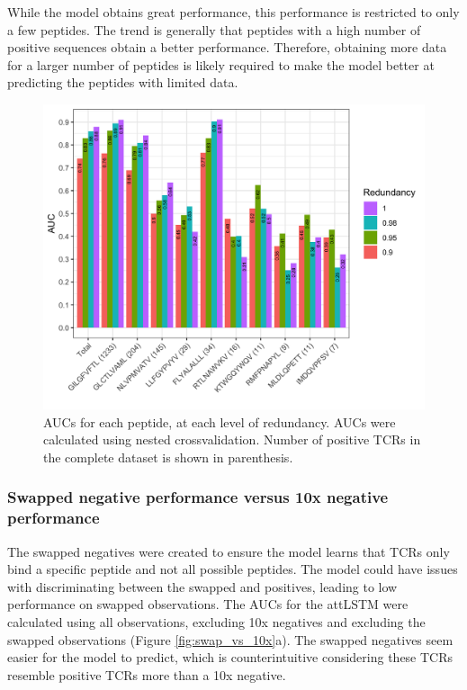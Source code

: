 While the model obtains great performance, this performance is restricted to only a few peptides. The trend is generally that peptides with a high number of positive sequences obtain a better performance. Therefore, obtaining more data for a larger number of peptides is likely required to make the model better at predicting the peptides with limited data.

\begin{figure}
    \centering
    \includegraphics[width=\linewidth]{figures/peptide_performance.png}
    \caption{AUCs for each peptide, at each level of redundancy. AUCs were calculated using nested crossvalidation. Number of positive TCRs in the complete dataset is shown in parenthesis.}
    \label{fig:performance_pr_pep}
\end{figure}

\subsubsection{Swapped negative performance versus 10x negative performance}

The swapped negatives were created to ensure the model learns that TCRs only bind a specific peptide and not all possible peptides. The model could have issues with discriminating between the swapped and positives, leading to low performance on swapped observations. The AUCs for the attLSTM were calculated using all observations, excluding 10x negatives and excluding the swapped observations (Figure \ref{fig:swap_vs_10x}a). The swapped negatives seem easier for the model to predict, which is counterintuitive considering these TCRs resemble positive TCRs more than a 10x negative.

